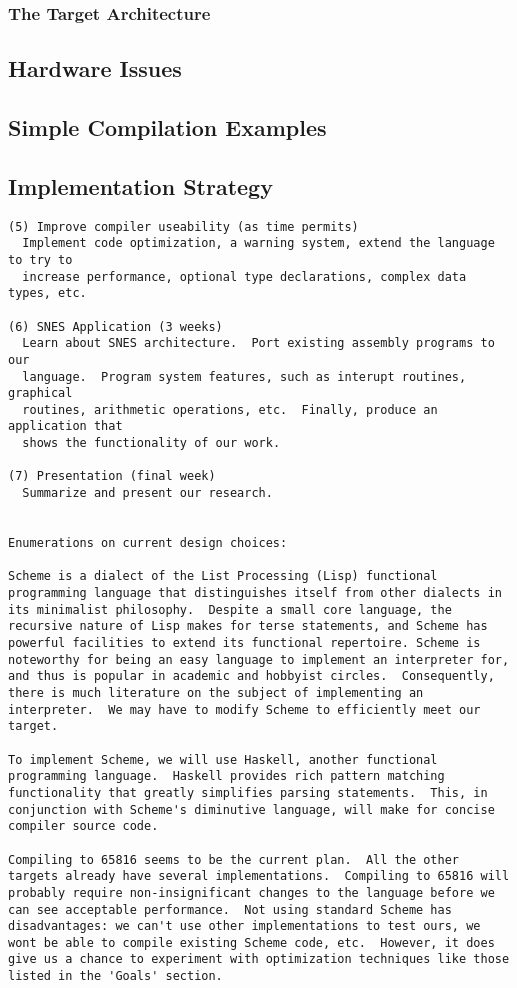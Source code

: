 \documentclass {article}
\begin{document}
\subsubsection{The Target Architecture}
\subsection{Hardware Issues}
\subsection{Simple Compilation Examples}
\subsection{Implementation Strategy}

\begin {verbatim}
(5) Improve compiler useability (as time permits)
  Implement code optimization, a warning system, extend the language to try to
  increase performance, optional type declarations, complex data types, etc.

(6) SNES Application (3 weeks)
  Learn about SNES architecture.  Port existing assembly programs to our
  language.  Program system features, such as interupt routines, graphical
  routines, arithmetic operations, etc.  Finally, produce an application that
  shows the functionality of our work.

(7) Presentation (final week)
  Summarize and present our research.


Enumerations on current design choices:

Scheme is a dialect of the List Processing (Lisp) functional
programming language that distinguishes itself from other dialects in
its minimalist philosophy.  Despite a small core language, the
recursive nature of Lisp makes for terse statements, and Scheme has
powerful facilities to extend its functional repertoire. Scheme is
noteworthy for being an easy language to implement an interpreter for,
and thus is popular in academic and hobbyist circles.  Consequently,
there is much literature on the subject of implementing an
interpreter.  We may have to modify Scheme to efficiently meet our
target.

To implement Scheme, we will use Haskell, another functional
programming language.  Haskell provides rich pattern matching
functionality that greatly simplifies parsing statements.  This, in
conjunction with Scheme's diminutive language, will make for concise
compiler source code.

Compiling to 65816 seems to be the current plan.  All the other
targets already have several implementations.  Compiling to 65816 will
probably require non-insignificant changes to the language before we
can see acceptable performance.  Not using standard Scheme has
disadvantages: we can't use other implementations to test ours, we
wont be able to compile existing Scheme code, etc.  However, it does
give us a chance to experiment with optimization techniques like those
listed in the 'Goals' section.

\end{verbatim}
\end{document}
